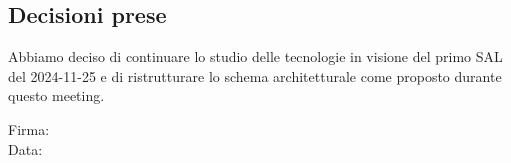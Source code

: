 \documentclass[12pt]{article}
\begin{document}
\subsection{Decisioni prese}
Abbiamo deciso di continuare lo studio delle tecnologie in visione del primo SAL del 2024-11-25 e di ristrutturare lo schema architetturale come proposto durante questo meeting.

\vfill
\begin{minipage}{10cm}
Firma: \hrulefill \\
\vspace{2mm}
Data: \dotfill
\end{minipage}
\end{document}
